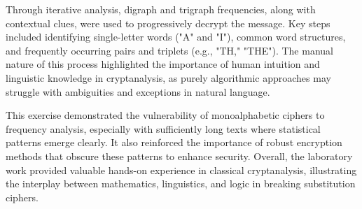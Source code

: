 \documentclass[12pt]{article}
\begin{document}
Through iterative analysis, digraph and trigraph frequencies, along with contextual clues, were used to progressively decrypt the message. Key steps included identifying single-letter words ("A" and "I"), common word structures, and frequently occurring pairs and triplets (e.g., "TH," "THE"). The manual nature of this process highlighted the importance of human intuition and linguistic knowledge in cryptanalysis, as purely algorithmic approaches may struggle with ambiguities and exceptions in natural language.

This exercise demonstrated the vulnerability of monoalphabetic ciphers to frequency analysis, especially with sufficiently long texts where statistical patterns emerge clearly. It also reinforced the importance of robust encryption methods that obscure these patterns to enhance security. Overall, the laboratory work provided valuable hands-on experience in classical cryptanalysis, illustrating the interplay between mathematics, linguistics, and logic in breaking substitution ciphers.

\pagebreak
\end{document}
